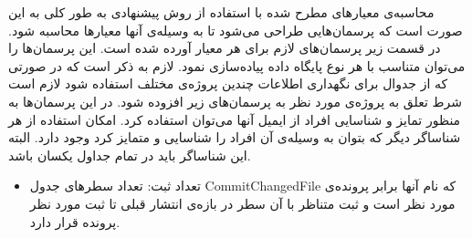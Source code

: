 محاسبه‌ی معیارهای مطرح شده با استفاده از روش پیشنهادی به طور کلی به این صورت است که پرسمان‌هایی طراحی می‌شود تا به وسیله‌ی آنها معیارها محاسبه شود. در قسمت زیر پرسمان‌های لازم  برای هر معیار آورده شده است. این پرسمان‌ها را می‌توان متناسب با هر نوع پایگاه داده پیاده‌سازی نمود. لازم به ذکر است که در صورتی که از جدوال برای نگهداری اطلاعات چندین پروژه‌ی مختلف استفاده  شود لازم است شرط تعلق به پروژه‌ی مورد نظر به پرسمان‌های زیر افزوده شود.  در این پرسمان‌ها به منظور تمایز و شناسایی افراد از ایمیل‌ آنها می‌توان استفاده کرد.   امکان استفاده از هر شناساگر دیگر که بتوان به وسیله‌ی آن افراد را شناسایی و متمایز کرد وجود دارد. البته این شناساگر باید در تمام جداول یکسان باشد. 
\begin{itemize}
	\item 
	تعداد ثبت:  تعداد سطر‌های جدول CommitChangedFile که نام آنها برابر پرونده‌ی مورد نظر است و ثبت متناظر با آن سطر در بازه‌ی انتشار قبلی تا ثبت مورد نظر پرونده قرار دارد.
	

\end{itemize}
